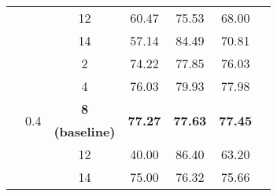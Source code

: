 \begin{sidewaystable}
\begin{adjustbox}{totalheight=0.85\textheight, width=\textwidth, keepaspectratio}
\begin{tabularx}{1.4\textwidth}{Xcccccc}
                                                       &                       & 12                       & 60.47                           & 75.53                           & 68.00                              &                                 \\ 
                                                       &                       & 14                       & 57.14                           & 84.49                           & 70.81                           &                                 \\ 
                                                       & \multirow{6}{*}{0.4}  & 2                        & 74.22                           & 77.85                           & 76.03                           &                                 \\ 
                                                       &                       & 4                        & 76.03                           & 79.93                           & 77.98                           &                                 \\ 
                                                       &                       & \textbf{8}               & \multirow{2}{*}{\textbf{77.27}} & \multirow{2}{*}{\textbf{77.63}} & \multirow{2}{*}{\textbf{77.45}} &                                 \\
                                                       &                       & \textbf{(baseline)}      &                                 &                                 &                                 &                                 \\ 
                                                       &                       & 12                       & 40.00                              & 86.40                            & 63.20                            &                                 \\ 
                                                       &                       & 14                       & 75.00                              & 76.32                           & 75.66                           &                                 \\ 

\bottomrule
\end{tabularx}
\end{adjustbox}
\end{sidewaystable}
